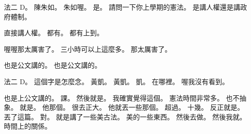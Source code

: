 \hypertarget{c01:cue:2494}{}法二 D。
\hypertarget{c01:cue:2495}{}陳朱如。
\hypertarget{c01:cue:2496}{}朱如喔。
\hypertarget{c01:cue:2497}{}是。
\hypertarget{c01:cue:2498}{}請問一下你上學期的憲法。
\hypertarget{c01:cue:2499}{}是講人權還是講政府體制。

\hypertarget{c01:cue:2500}{}直接講人權。
\hypertarget{c01:cue:2501}{}都有。
\hypertarget{c01:cue:2502}{}都有上到。

\hypertarget{c01:cue:2503}{}喔喔那太厲害了。
\hypertarget{c01:cue:2504}{}三小時可以上這麼多。
\hypertarget{c01:cue:2505}{}那太厲害了。

\hypertarget{c01:cue:2506}{}也是公文講的。
\hypertarget{c01:cue:2507}{}也是公文講的。

\hypertarget{c01:cue:2508}{}法二 D。
\hypertarget{c01:cue:2509}{}這個字是怎麼念。
\hypertarget{c01:cue:2510}{}黃凱。
\hypertarget{c01:cue:2511}{}黃凱。
\hypertarget{c01:cue:2512}{}凱。
\hypertarget{c01:cue:2513}{}在哪裡。
\hypertarget{c01:cue:2514}{}喔我沒有看到。

\hypertarget{c01:cue:2515}{}也是上公文講的。
\hypertarget{c01:cue:2516}{}課。
\hypertarget{c01:cue:2517}{}然後就是。
\hypertarget{c01:cue:2518}{}我確實覺得這個。
\hypertarget{c01:cue:2519}{}憲法時間非常多。
\hypertarget{c01:cue:2520}{}也不抽象。
\hypertarget{c01:cue:2521}{}就是。
\hypertarget{c01:cue:2522}{}他那個。
\hypertarget{c01:cue:2523}{}很去正大。
\hypertarget{c01:cue:2524}{}他就丟一些那個。
\hypertarget{c01:cue:2525}{}超過。
\hypertarget{c01:cue:2526}{}十幾。
\hypertarget{c01:cue:2527}{}反正就是。
\hypertarget{c01:cue:2528}{}丟了這篇。
\hypertarget{c01:cue:2529}{}對。
\hypertarget{c01:cue:2530}{}就是講了一些美古法。
\hypertarget{c01:cue:2531}{}美的一些東西。
\hypertarget{c01:cue:2532}{}然後去做。
\hypertarget{c01:cue:2533}{}然後我就。
\hypertarget{c01:cue:2534}{}時間上的關係。

